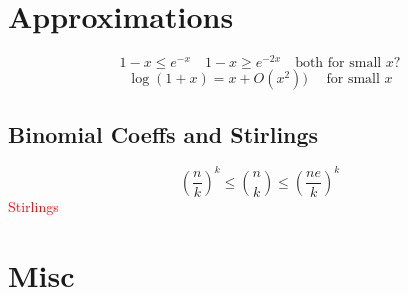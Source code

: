 \documentclass{article}
\newcommand\myworries[1]{\textcolor{red}{#1}}
\begin{document}
\newpage 
\section{Approximations}

$$1-x \leq e^{-x} \quad 1-x\geq e^{-2x} \quad \text{both for small } x?$$  
$$\log(1+x) = x + O(x^2)) \quad \text{ for small } x$$


\subsection{Binomial Coeffs and Stirlings}
$$(\frac{n}{k})^k \leq \binom{n}{k} \leq (\frac{ne}{k})^k $$
\myworries{Stirlings}


\section{Misc}
\begin{definition}[Metric]
\end{definition}
\end{document}
